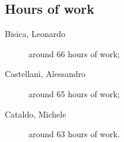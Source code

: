 \documentclass[12pt, a4paper]{article}
\begin{document}
		\subsection{Hours of work}
			\begin{description}
				\item[Bisica, Leonardo] around 66 hours of work;
				\item[Castellani, Alessandro] around 65 hours of work;
				\item[Cataldo, Michele] around 63 hours of work.
			\end{description}
			
\end{document}
